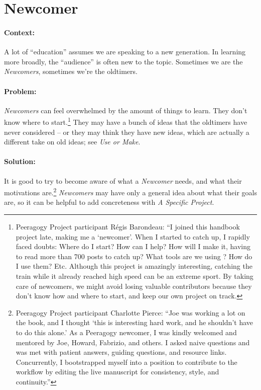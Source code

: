 \section{Newcomer}
\paragraph{Context:}
A lot of ``education'' assumes we are speaking to a new generation. 
In learning more broadly, the ``audience'' is often new to the topic.
Sometimes we are the \emph{Newcomers}, sometimes we're the oldtimers.

\paragraph{Problem:} \emph{Newcomers} can feel overwhelmed by the amount of things to learn.  They
don't know where to start.\footnote{Peeragogy Project participant
R\'egis Barondeau: ``I joined this handbook project late, making me
a `newcomer'. When I started to catch up, I rapidly faced doubts:
Where do I start? How can I help? How will I make it, having to read
more than 700 posts to catch up? What tools are we using ? How do I use
them? Etc. Although this project is amazingly interesting, catching the
train while it already reached high speed can be an extreme sport. By
taking care of newcomers, we might avoid losing valuable contributors
because they don't know how and where to start, and keep our own project
on track.}  They may have a bunch of ideas that the oldtimers have
never considered -- or they may think they have new ideas, which are actually
a different take on old ideas; see \emph{Use or Make}.

\paragraph{Solution:} It is good to try to become aware of what a \emph{Newcomer}
needs, and what their motivations are.\footnote{Peeragogy Project participant
Charlotte Pierce: ``Joe was working a lot on the book, and I thought
`this is interesting hard work, and he shouldn't have to do
this alone.' As a Peeragogy newcomer, I was kindly welcomed and
mentored by Joe, Howard, Fabrizio, and others. I asked naive questions
and was met with patient answers, guiding questions, and resource links.
Concurrently, I bootstrapped myself into a position to contribute to the
workflow by editing the live manuscript for consistency, style, and continuity.''}
\emph{Newcomers} may have only a general idea about what their goals are, so it can be
helpful to add concreteness with \emph{A Specific Project}.

